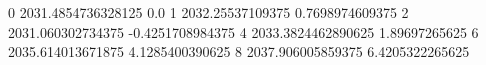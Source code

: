 0 2031.4854736328125 0.0
1 2032.25537109375 0.7698974609375
2 2031.060302734375 -0.4251708984375
4 2033.3824462890625 1.89697265625
6 2035.614013671875 4.1285400390625
8 2037.906005859375 6.4205322265625
